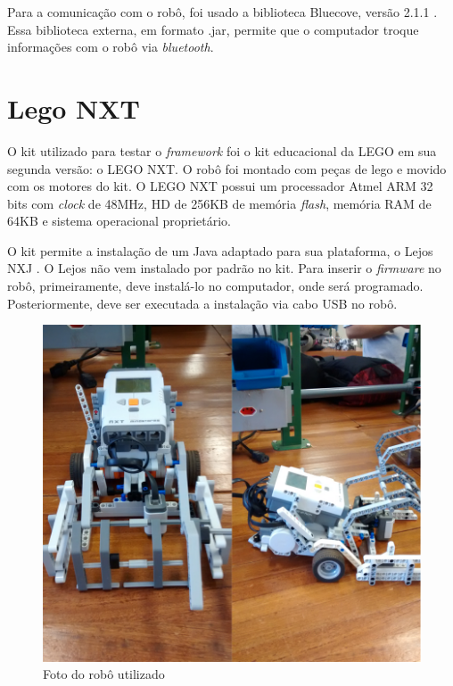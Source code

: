 Para a comunicação com o robô, foi usado a biblioteca Bluecove, versão 2.1.1 \cite{SITE_BLUECOVE}. Essa biblioteca externa, em formato .jar, permite que o computador troque informações com o robô via \textit{bluetooth}.

\section{Lego NXT}

O kit utilizado para testar o \textit{framework} foi o kit educacional da LEGO em sua segunda versão: o LEGO NXT. O robô foi montado com peças de lego e movido com os motores do kit. O LEGO NXT possui um processador Atmel ARM 32 bits com \textit{clock} de 48MHz, HD de 256KB de memória \textit{flash}, memória RAM de 64KB e sistema operacional proprietário.

O kit permite a instalação de um Java adaptado para sua plataforma, o Lejos NXJ \cite{LEJOS_SITE}. O Lejos não vem instalado por padrão no kit. Para inserir o \textit{firmware} no robô, primeiramente, deve instalá-lo no computador, onde será programado. Posteriormente, deve ser executada a instalação via cabo USB no robô.

\begin{figure}[h]
	\centering
	\label{fig17}
		\includegraphics[keepaspectratio=true,scale=0.2]{figuras/5nxtBrick.png}
	\caption{Foto do robô utilizado}
\end{figure}

